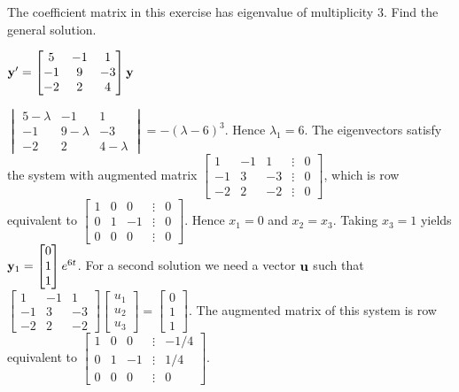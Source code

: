 \documentclass{ximera}
\begin{document}
 \begin{problem}\label{exer:10.5.24}
 The coefficient matrix in this exercise
has eigenvalue of multiplicity $3$. Find the
general solution.

$ {\bf y}'
= \begin{bmatrix}5&-1&1\\-1&9&-3\\-2&2&4\end{bmatrix}{\bf y}$

\begin{solution}
    $ \begin{vmatrix}5-\lambda&-1&1\\-1&9-\lambda&-3\\-2&2&4-\lambda\end{vmatrix}
=-(\lambda-6)^3$.
Hence $\lambda_1=6$. The eigenvectors
 satisfy the system with  augmented matrix
$  \begin{bmatrix}1&-1&1&\vdots&0\\-1&3&-3&
\vdots&0\\-2&2&-2&\vdots&0 \end{bmatrix}$,
which is row equivalent to
$  \begin{bmatrix}1&0&0&\vdots&0\\0&1&-1&
\vdots&0\\0&0&0&\vdots&0 \end{bmatrix}$.
Hence  $x_1=0$ and $x_2=x_3$.  Taking $x_3=1$
yields
${\bf y}_1=  \begin{bmatrix}0\\1\\1 \end{bmatrix}e^{6t}$.
For a second solution we need a vector ${\bf u}$ such that
$  \begin{bmatrix}1&-1&1\\-1&3&-3\\-2&2&-2 \end{bmatrix} \begin{bmatrix}u_1\\u_2\\u_3 \end{bmatrix}
=  \begin{bmatrix}0\\1\\1 \end{bmatrix}$.
The augmented matrix of this system is row equivalent to
$  \begin{bmatrix}1&0&0&\vdots&-1/4\\0&1&-1&
\vdots&1/4\\0&0&0&\vdots&0 \end{bmatrix}$.

\end{solution}
\end{problem}
\end{document}
